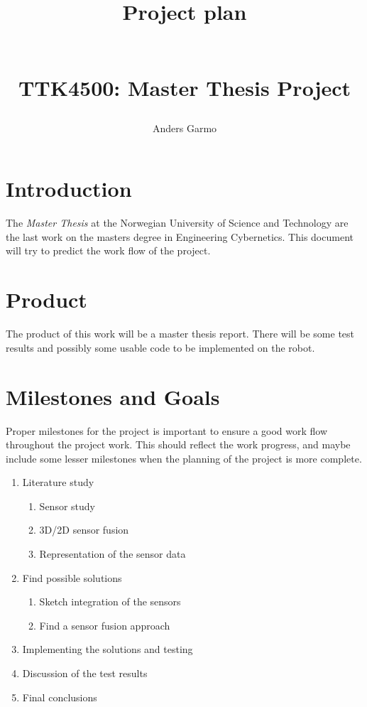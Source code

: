 \documentclass[a4paper, 10pt]{article}
\title{\begin{huge}\textbf{Project plan}\end{huge} \\ TTK4500: Master Thesis Project }
\author{Anders Garmo}
\begin{document}
\maketitle

\newpage


\section{Introduction}
The \emph{Master Thesis} at the Norwegian University of Science and Technology are the
last work on the masters degree in Engineering Cybernetics. This document will try to
predict the work flow of the project. 

\section{Product}
The product of this work will be a master thesis report. There will be some test results
and possibly some usable code to be implemented on the robot.

\section{Milestones and Goals}
Proper milestones for the project is important to ensure a good work flow throughout the
project work. This should reflect the work progress, and maybe include some lesser
milestones when the planning of the project is more complete.

\begin{enumerate}
    \item Literature study
        \begin{enumerate}
            \item Sensor study
            \item 3D/2D sensor fusion
            \item Representation of the sensor data
        \end{enumerate}
    \item Find possible solutions
        \begin{enumerate}
            \item Sketch integration of the sensors
            \item Find a sensor fusion approach
        \end{enumerate}
    \item Implementing the solutions and testing
    \item Discussion of the test results
    \item Final conclusions
\end{enumerate}
\end{document}
